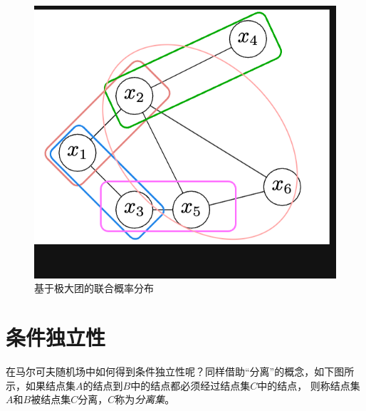 \begin{figure}[H]
    \centering
    \includegraphics[scale=0.5]{figures/基于极大团的联合概率分布.png}
    \caption{基于极大团的联合概率分布}
\end{figure}

\section{条件独立性}

在马尔可夫随机场中如何得到条件独立性呢？同样借助“分离”的概念，如下图所示，如果结点集$A$的结点到$B$中的结点都必须经过结点集$C$中的结点，
则称结点集$A$和$B$被结点集$C$分离，$C$称为\textsl{分离集}。

